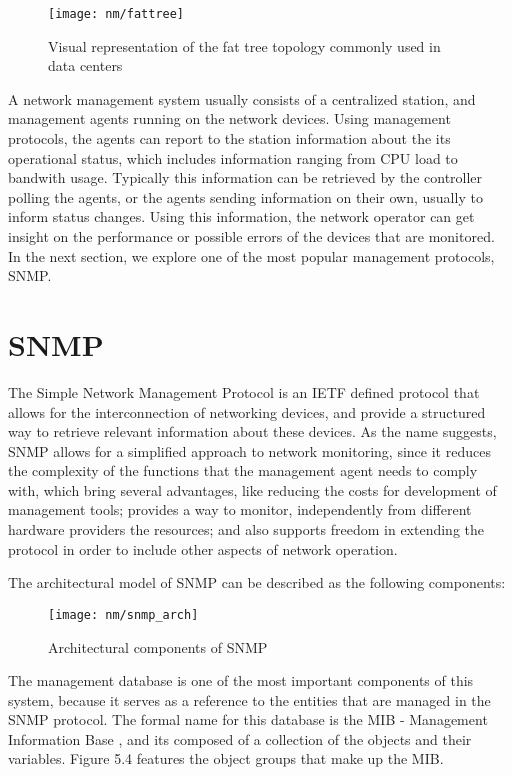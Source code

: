 \begin{figure} [h]
    \texttt{[image: nm/fattree]}
\caption{Visual representation of the fat tree topology commonly used in data centers}
\end{figure}

A network management system usually consists of a centralized station, and management agents running on the network devices. Using management protocols, the agents can report to the station information about the its operational 
status, which includes information ranging from CPU load to bandwith usage. Typically this information can be retrieved by the controller polling the agents, or the agents sending information on their own, usually to inform
status changes. Using this information, the network operator can get insight on the performance or possible errors of the devices that are monitored. In the next section, we explore one of the most popular management protocols,
SNMP.

\section {SNMP}

The Simple Network Management Protocol is an IETF defined protocol that allows for the interconnection of networking devices, and provide a structured way to retrieve relevant information about these devices. As the name suggests,
SNMP allows for a simplified approach to network monitoring, since it reduces the complexity of the functions that the management agent needs to comply with, which bring several advantages, like reducing
the costs for development of management tools; provides a way to monitor, independently from different hardware providers the resources; and also supports freedom in extending the protocol in order to include other aspects of 
network operation. \cite{CITE - RFC 1157} %
\par  The architectural model of SNMP can be described as the following components:
    
\begin{figure} [h]
    \texttt{[image: nm/snmp\_arch]}
    \caption{Architectural components of SNMP}
\end{figure}

The management database is one of the most important components of this system, because it serves as a reference to the entities that are managed in the SNMP protocol. The formal name for this database is the MIB - Management 
Information Base \cite {CITE - RFC 1155}, and its composed of a collection of the objects and their variables. Figure 5.4 features the object groups that make up the MIB. 

